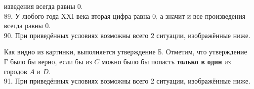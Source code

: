 \documentclass[12pt]{article}
\begin{document}
изведения всегда равны 0.\\
89. У любого года XXI века вторая цифра равна 0, а значит и все произведения всегда равны 0.\\
90. При приведённых условиях возможны всего 2 ситуации, изображённые ниже.
\begin{center}
\begin{figure}[ht!]
\end{figure}
\end{center}
Как видно из картинки, выполняется утверждение Б. Отметим, что утверждение Г было бы верно, если бы из $C$ можно было бы попасть {\bf только в один} из городов $A$ и $D.$\\
91. При приведённых условиях возможны всего 2 ситуации, изображённые ниже.
\begin{center}
\begin{figure}[ht!]
\end{figure}
\end{center}
\end{document}

